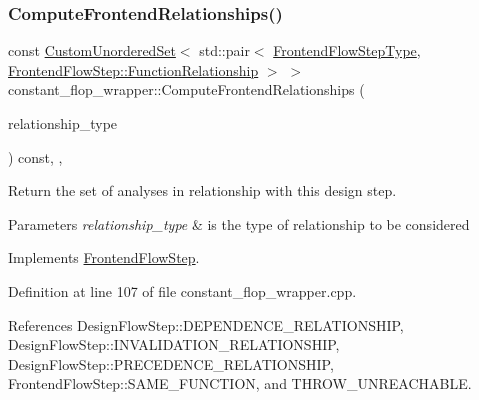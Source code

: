 \subsubsection{\texorpdfstring{Compute\+Frontend\+Relationships()}{ComputeFrontendRelationships()}}
{\footnotesize\ttfamily const \hyperlink{classCustomUnorderedSet}{Custom\+Unordered\+Set}$<$ std\+::pair$<$ \hyperlink{frontend__flow__step_8hpp_afeb3716c693d2b2e4ed3e6d04c3b63bb}{Frontend\+Flow\+Step\+Type}, \hyperlink{classFrontendFlowStep_af7cf30f2023e5b99e637dc2058289ab0}{Frontend\+Flow\+Step\+::\+Function\+Relationship} $>$ $>$ constant\+\_\+flop\+\_\+wrapper\+::\+Compute\+Frontend\+Relationships (\begin{DoxyParamCaption}\item[{const \hyperlink{classDesignFlowStep_a723a3baf19ff2ceb77bc13e099d0b1b7}{Design\+Flow\+Step\+::\+Relationship\+Type}}]{relationship\+\_\+type }\end{DoxyParamCaption}) const\hspace{0.3cm}{\ttfamily [override]}, {\ttfamily [protected]}, {\ttfamily [virtual]}}



Return the set of analyses in relationship with this design step. 


\begin{DoxyParams}{Parameters}
{\em relationship\+\_\+type} & is the type of relationship to be considered \\
\hline
\end{DoxyParams}


Implements \hyperlink{classFrontendFlowStep_abeaff70b59734e462d347ed343dd700d}{Frontend\+Flow\+Step}.



Definition at line 107 of file constant\+\_\+flop\+\_\+wrapper.\+cpp.



References Design\+Flow\+Step\+::\+D\+E\+P\+E\+N\+D\+E\+N\+C\+E\+\_\+\+R\+E\+L\+A\+T\+I\+O\+N\+S\+H\+IP, Design\+Flow\+Step\+::\+I\+N\+V\+A\+L\+I\+D\+A\+T\+I\+O\+N\+\_\+\+R\+E\+L\+A\+T\+I\+O\+N\+S\+H\+IP, Design\+Flow\+Step\+::\+P\+R\+E\+C\+E\+D\+E\+N\+C\+E\+\_\+\+R\+E\+L\+A\+T\+I\+O\+N\+S\+H\+IP, Frontend\+Flow\+Step\+::\+S\+A\+M\+E\+\_\+\+F\+U\+N\+C\+T\+I\+ON, and T\+H\+R\+O\+W\+\_\+\+U\+N\+R\+E\+A\+C\+H\+A\+B\+LE.

\mbox{\label{classconstant__flop__wrapper_a3932918373450f7c7a399b89488a7ec8}} 
